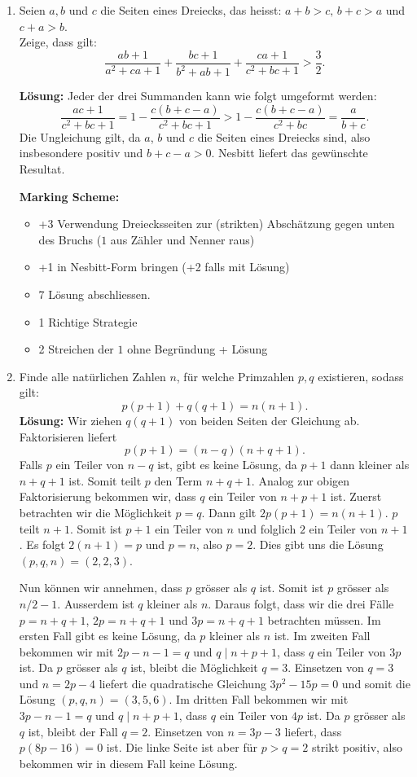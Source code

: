 \documentclass[language=german,style=solution]{smo}
\begin{document}
\begin{enumerate}[label=\textbf{\arabic*.}]
\newpage

\item
Seien $a,b$ und $c$ die Seiten eines Dreiecks, das heisst: $a+b > c,\, b+c > a$ und $c+a > b$.\\
Zeige, dass gilt: 
\[
\frac{ab+1}{a^2+ca+1}+\frac{bc+1}{b^2+ab+1}+\frac{ca+1}{c^2+bc+1}>\frac{3}{2}.
\]

\textbf{Lösung:} Jeder der drei Summanden kann wie folgt umgeformt werden:
\[
\frac{ac+1}{c^2+bc+1}=1-\frac{c(b+c-a)}{c^2+bc+1}>1-\frac{c(b+c-a)}{c^2+bc}=\frac{a}{b+c}.
\]
Die Ungleichung gilt, da $a$, $b$ und $c$ die Seiten eines Dreiecks sind, also insbesondere positiv und $b+c-a>0$. Nesbitt liefert das gewünschte Resultat.

\textbf{Marking Scheme:}
\begin{itemize}
\item +3 Verwendung Dreiecksseiten zur (strikten) Abschätzung gegen unten des Bruchs ($1$ aus Zähler und Nenner raus)
\item +1 in Nesbitt-Form bringen (+2 falls mit Lösung)
\item 7 Lösung abschliessen.
\item 1 Richtige Strategie
\item 2 Streichen der $1$ ohne Begründung + Lösung
\end{itemize}


\newpage

\item
Finde alle natürlichen Zahlen $n$, für welche Primzahlen $p,q$ existieren, sodass gilt:
\[
p(p + 1) + q(q +1) = n(n + 1).
\]
\textbf{Lösung:} Wir ziehen $q(q+1)$ von beiden Seiten der Gleichung ab. Faktorisieren liefert
\[
p(p+1)=(n-q)(n+q+1).
\]
Falls $p$ ein Teiler von $n-q$ ist, gibt es keine Lösung, da $p+1$ dann kleiner als $n+q+1$ ist. Somit teilt $p$ den Term $n+q+1$. Analog zur obigen Faktorisierung bekommen wir, dass $q$ ein Teiler von $n+p+1$ ist. Zuerst betrachten wir die Möglichkeit $p=q$.  Dann gilt $2p(p+1)=n(n+1)$. $p$ teilt $n+1$. Somit ist $p+1$ ein Teiler von $n$ und folglich $2$ ein Teiler von $n+1$. Es folgt $2(n+1)=p$ und $p=n$, also $p=2$. Dies gibt uns die Lösung $(p,q,n)=(2,2,3)$.
	
Nun können wir annehmen, dass $p$ grösser als $q$ ist. Somit ist $p$ grösser als $n/2-1$. Ausserdem ist $q$ kleiner als $n$. Daraus folgt, dass wir die drei Fälle $p=n+q+1$, $2p=n+q+1$ und $3p=n+q+1$ betrachten müssen. Im ersten Fall gibt es keine Lösung, da $p$ kleiner als $n$ ist. Im zweiten Fall bekommen wir mit $2p-n-1=q$ und $q \mid n+p+1$, dass $q$ ein Teiler von $3p$ ist. Da $p$ grösser als $q$ ist, bleibt die Möglichkeit $q=3$. Einsetzen von $q=3$ und $n=2p-4$ liefert die quadratische Gleichung $3p^2-15p=0$ und somit die Lösung $(p,q,n)=(3,5,6)$. Im dritten Fall bekommen wir mit $3p-n-1=q$ und $q\mid n+p+1$, dass $q$ ein Teiler von $4p$ ist. Da $p$ grösser als $q$ ist, bleibt der Fall $q=2$. Einsetzen von $n=3p-3$ liefert, dass $p(8p-16)=0$ ist. Die linke Seite ist aber für $p>q=2$ strikt positiv, also bekommen wir in diesem Fall keine Lösung.
	

\end{enumerate}
\end{document}
